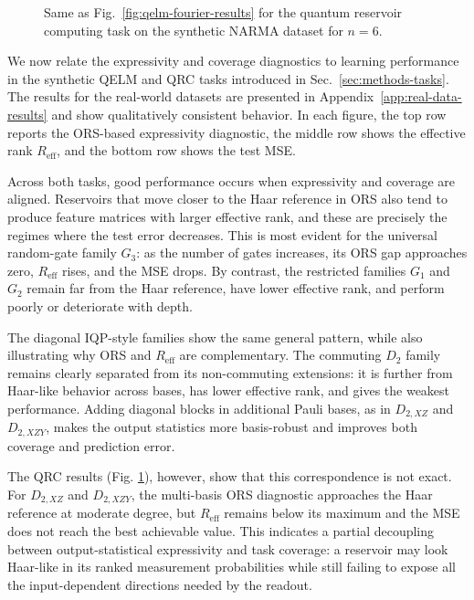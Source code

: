 \documentclass[
    aps,
    pre,
    amsmath,
    amssymb,
    reprint,
    superscriptaddress,
    preprintnumbers,
]{revtex4-2}
\begin{document}
\begin{figure}[t]
\centering
\resizebox{0.9\textwidth}{!}{%
}
\caption{Same as Fig.~\ref{fig:qelm-fourier-results} for the quantum reservoir computing task on the synthetic NARMA dataset for $n=6$.}
\label{fig:qrc-narma-results}
\end{figure}

We now relate the expressivity and coverage diagnostics to learning performance in the synthetic QELM and QRC tasks introduced in Sec.~\ref{sec:methods-tasks}. The results for the real-world datasets are presented in Appendix~\ref{app:real-data-results} and show qualitatively consistent behavior. In each figure, the top row reports the ORS-based expressivity diagnostic, the middle row shows the effective rank $R_{\mathrm{eff}}$, and the bottom row shows the test MSE.

Across both tasks, good performance occurs when expressivity and coverage are aligned. Reservoirs that move closer to the Haar reference in ORS also tend to produce feature matrices with larger effective rank, and these are precisely the regimes where the test error decreases. This is most evident for the universal random-gate family $G_3$: as the number of gates increases, its ORS gap approaches zero, $R_{\mathrm{eff}}$ rises, and the MSE drops. By contrast, the restricted families $G_1$ and $G_2$ remain far from the Haar reference, have lower effective rank, and perform poorly or deteriorate with depth.

The diagonal IQP-style families show the same general pattern, while also illustrating why ORS and $R_{\mathrm{eff}}$ are complementary. The commuting $D_2$ family remains clearly separated from its non-commuting extensions: it is further from Haar-like behavior across bases, has lower effective rank, and gives the weakest performance. Adding diagonal blocks in additional Pauli bases, as in $D_{2,XZ}$ and $D_{2,XZY}$, makes the output statistics more basis-robust and improves both coverage and prediction error.

The QRC results (Fig. \ref{fig:qrc-narma-results}), however, show that this correspondence is not exact. For $D_{2,XZ}$ and $D_{2,XZY}$, the multi-basis ORS diagnostic approaches the Haar reference at moderate degree, but $R_{\mathrm{eff}}$ remains below its maximum and the MSE does not reach the best achievable value. This indicates a partial decoupling between output-statistical expressivity and task coverage: a reservoir may look Haar-like in its ranked measurement probabilities while still failing to expose all the input-dependent directions needed by the readout.
\end{document}
